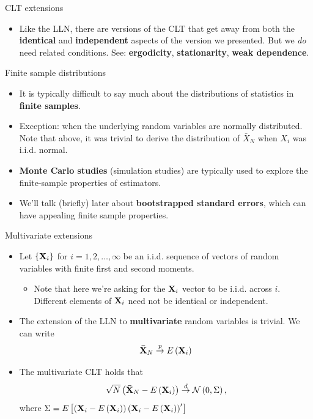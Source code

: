 \begin{frame}{CLT extensions}

\begin{itemize}
	\item Like the LLN, there are versions of the CLT that get away from both the {\bf identical} and {\bf independent}
			aspects of the version we presented. But we \emph{do} need related conditions. See: {\bf ergodicity}, 
			{\bf stationarity}, {\bf weak dependence}.
\end{itemize}
\end{frame}



\begin{frame}{Finite sample distributions}
\begin{itemize}
	\item It is typically difficult to say much about the distributions of statistics 
			in {\bf finite samples}.

	\smallskip
	\item Exception: when the underlying random variables are normally distributed. Note that
			above, it was trivial to derive the distribution of $\bar{X}_N$ when $X_i$ was
			i.i.d. normal.
			
	\smallskip
	\item {\bf Monte Carlo studies} (simulation studies) are typically used to explore 
			the finite-sample properties of estimators. 
			
	\smallskip
	\item We'll talk (briefly) later about {\bf bootstrapped standard errors},
			which can have appealing finite sample properties. 

\end{itemize}
\end{frame}


\begin{frame}{Multivariate extensions}
\begin{itemize}
	\item Let $\left\{{\bf X}_i\right\}$ for $i=1,2,\dots,\infty$ be an i.i.d. sequence of vectors of random variables
			with finite first and second moments. 
	\begin{itemize}		
		\item Note that here we're asking for the ${\bf X}_i$ vector to be i.i.d. across $i$. Different elements of
		${\bf X}_i$ need not be identical or independent. 
	\end{itemize}


	\item The extension of the LLN to {\bf multivariate} random variables is trivial. We can write\[
			{\bf \bar{X}}_N \overset{p}{\rightarrow} E\left( {\bf X}_i \right)
		\]
		
	\item The multivariate CLT holds that\[
		\sqrt{N} \left({\bf \bar{X}}_N - E\left( {\bf X}_i \right) \right) \overset{d}{\rightarrow} \mathcal{N} \left(0,\Sigma\right),
	\]
	where $\Sigma = E\left[\left({\bf X}_i - E\left( {\bf X}_i \right)\right)\left({\bf X}_i - E\left( {\bf X}_i \right)\right)'\right]$

\end{itemize}
\end{frame}


